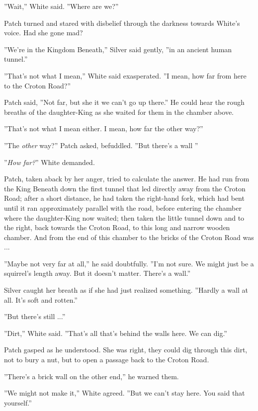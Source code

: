 \documentclass[11pt]{article}
\begin{document}
 ''Wait,'' White said. ''Where are we?''\par
 Patch turned and stared with disbelief through the darkness towards White's voice. Had she gone mad?\par
 ''We're in the Kingdom Beneath,'' Silver said gently, ''in an ancient human tunnel.''\par
 ''That's not what I mean,'' White said exasperated. ''I mean, how far from here to the Croton Road?''\par
 Patch said, ''Not far, but she %
 it %
 we can't go up there.'' He could hear the rough breaths of the daughter-King as she waited for them in the chamber above.\par
 ''That's not what I mean either. I mean, how far the other way?''\par
 ''The {\it other} way?'' Patch asked, befuddled. ''But there's a wall %
''\par
 ''{\it How far?}'' White demanded.\par
 Patch, taken aback by her anger, tried to calculate the answer. He had run from the King Beneath down the first tunnel that led directly away from the Croton Road; after a short distance, he had taken the right-hand fork, which had bent until it ran approximately parallel with the road, before entering the chamber where the daughter-King now waited; then taken the little tunnel down and to the right, back towards the Croton Road, to this long and narrow wooden chamber. And from the end of this chamber to the bricks of the Croton Road was ...\par
 ''Maybe not very far at all,'' he said doubtfully. ''I'm not sure. We might just be a squirrel's length away. But it doesn't matter. There's a wall.''\par
 Silver caught her breath as if she had just realized something. ''Hardly a wall at all. It's soft and rotten.''\par
 ''But there's still ...''\par
 ''Dirt,'' White said. ''That's all that's behind the walls here. We can dig.''\par
 Patch gasped as he understood. She was right, they could dig through this dirt, not to bury a nut, but to open a passage back to the Croton Road.\par
 ''There's a brick wall on the other end,'' he warned them.\par
 ''We might not make it,'' White agreed. ''But we can't stay here. You said that yourself.''\par
\end{document}
